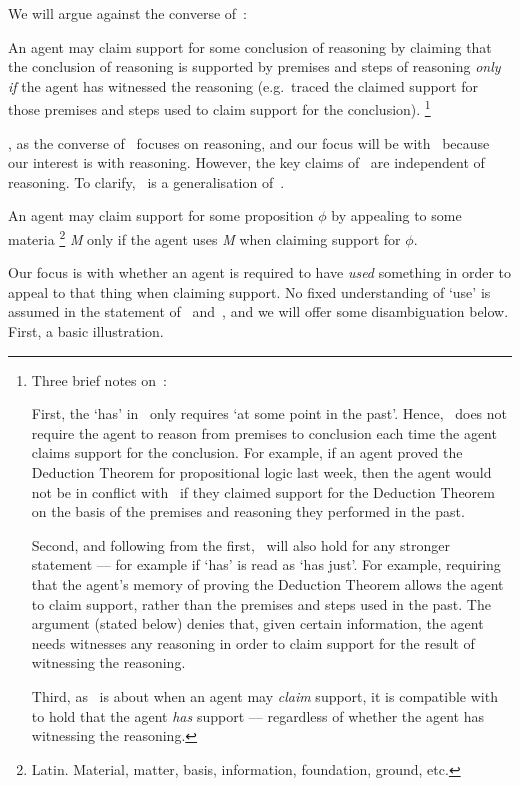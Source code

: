 \begin{note}[Focus]
  We will argue against the converse of~\USE{}:

  \begin{proposition}[\ESU{-} --- \ESU{}]\label{denied-claim}
    An agent may claim support for some conclusion of reasoning by claiming that the conclusion of reasoning is supported by premises and steps of reasoning \emph{only if} the agent has witnessed the reasoning (e.g.\ traced the claimed support for those premises and steps used to claim support for the conclusion).\nolinebreak
      \footnote{
    Three brief notes on~\ESU{}:

    First, the `has' in~\ESU{} only requires `at some point in the past'.
    Hence,~\ESU{} does not require the agent to reason from premises to conclusion each time the agent claims support for the conclusion.
    For example, if an agent proved the Deduction Theorem for propositional logic last week, then the agent would not be in conflict with~\ESU{} if they claimed support for the Deduction Theorem on the basis of the premises and reasoning they performed in the past.

    Second, and following from the first,~\ESU{} will also hold for any stronger statement --- for example if `has' is read as `has just'.
    For example, requiring that the agent's memory of proving the Deduction Theorem allows the agent to claim support, rather than the premises and steps used in the past.
    The argument (stated below) denies that, given certain information, the agent needs witnesses any reasoning in order to claim support for the result of witnessing the reasoning.

    Third, as~\ESU{} is about when an agent may \emph{claim} support, it is compatible with~\ESU{} to hold that the agent \emph{has} support --- regardless of whether the agent has witnessing the reasoning.
  }
  \end{proposition}

  \ESU{}, as the converse of~\USE{} focuses on reasoning, and our focus will be with~\ESU{} because our interest is with reasoning.
  However, the key claims of~\ESU{} are independent of reasoning.
  To clarify,~\gESU{} is a generalisation of~\ESU{}.

  \begin{proposition}[\gESU{}]
    An agent may claim support for some proposition \(\phi\) by appealing to some materia\nolinebreak
    \footnote{Latin.
      Material, matter, basis, information, foundation, ground, etc.
    }
    \emph{M} only if the agent uses \emph{M} when claiming support for \(\phi\).
  \end{proposition}
  Our focus is with whether an agent is required to have \emph{used} something in order to appeal to that thing when claiming support.
  No fixed understanding of `use' is assumed in the statement of~\ESU{} and~\gESU{}, and we will offer some disambiguation below.
  First, a basic illustration.
\end{note}

